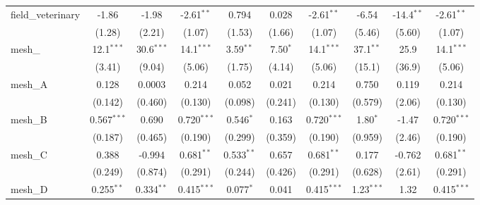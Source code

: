 \begin{tabular}{lccccccccc}
   field\_veterinary                                           & -1.86          & -1.98          & -2.61$^{**}$   & 0.794         & 0.028          & -2.61$^{**}$   & -6.54         & -14.4$^{**}$ & -2.61$^{**}$\\   
                                                               & (1.28)         & (2.21)         & (1.07)         & (1.53)        & (1.66)         & (1.07)         & (5.46)        & (5.60)       & (1.07)\\   
   mesh\_                                                      & 12.1$^{***}$   & 30.6$^{***}$   & 14.1$^{***}$   & 3.59$^{**}$   & 7.50$^{*}$     & 14.1$^{***}$   & 37.1$^{**}$   & 25.9         & 14.1$^{***}$\\   
                                                               & (3.41)         & (9.04)         & (5.06)         & (1.75)        & (4.14)         & (5.06)         & (15.1)        & (36.9)       & (5.06)\\   
   mesh\_A                                                     & 0.128          & 0.0003         & 0.214          & 0.052         & 0.021          & 0.214          & 0.750         & 0.119        & 0.214\\   
                                                               & (0.142)        & (0.460)        & (0.130)        & (0.098)       & (0.241)        & (0.130)        & (0.579)       & (2.06)       & (0.130)\\   
   mesh\_B                                                     & 0.567$^{***}$  & 0.690          & 0.720$^{***}$  & 0.546$^{*}$   & 0.163          & 0.720$^{***}$  & 1.80$^{*}$    & -1.47        & 0.720$^{***}$\\   
                                                               & (0.187)        & (0.465)        & (0.190)        & (0.299)       & (0.359)        & (0.190)        & (0.959)       & (2.46)       & (0.190)\\   
   mesh\_C                                                     & 0.388          & -0.994         & 0.681$^{**}$   & 0.533$^{**}$  & 0.657          & 0.681$^{**}$   & 0.177         & -0.762       & 0.681$^{**}$\\   
                                                               & (0.249)        & (0.874)        & (0.291)        & (0.244)       & (0.426)        & (0.291)        & (0.628)       & (2.61)       & (0.291)\\   
   mesh\_D                                                     & 0.255$^{**}$   & 0.334$^{**}$   & 0.415$^{***}$  & 0.077$^{*}$   & 0.041          & 0.415$^{***}$  & 1.23$^{***}$  & 1.32         & 0.415$^{***}$\\   

\end{tabular}
